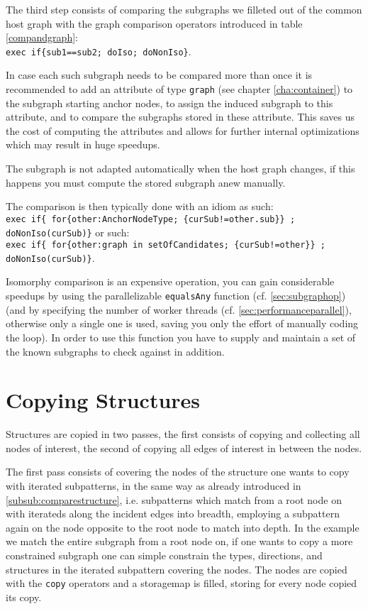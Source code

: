 The third step consists of comparing the subgraphs we filleted out of the common host graph with the graph comparison operators introduced in table \ref{compandgraph}:\\
\verb#exec if{sub1==sub2; doIso; doNonIso}#.

In case each such subgraph needs to be compared more than once it is recommended to add an attribute of type \texttt{graph} (see chapter \ref{cha:container}) to the subgraph starting anchor nodes, to assign the induced subgraph to this attribute, and to compare the subgraphs stored in these attribute.
This saves us the cost of computing the attributes and allows for further internal optimizations which 
may result in huge speedups.

\begin{warning}
The subgraph is not adapted automatically when the host graph changes, if this happens you must compute the stored subgraph anew manually.
\end{warning}

\noindent The comparison is then typically done with an idiom as such:\\
\verb#exec if{ for{other:AnchorNodeType; {curSub!=other.sub}} ; doNonIso(curSub)}# 
or such:\\
\verb#exec if{ for{other:graph in setOfCandidates; {curSub!=other}} ; doNonIso(curSub)}#.

Isomorphy comparison is an expensive operation, you can gain considerable speedups by using the parallelizable \texttt{equalsAny} function (cf. \ref{sec:subgraphop}) (and by specifying the number of worker threads (cf. \ref{sec:performanceparallel}), otherwise only a single one is used, saving you only the effort of manually coding the loop). 
In order to use this function you have to supply and maintain a set of the known subgraphs to check against in addition. 

\section{Copying Structures}\label{subsub:copystructure}
Structures are copied in two passes, the first consists of copying and collecting all nodes of interest, the second of copying all edges of interest in between the nodes.

The first pass consists of covering the nodes of the structure one wants to copy with iterated subpatterns,
in the same way as already introduced in \ref{subsub:comparestructure},
i.e. subpatterns which match from a root node on with iterateds along the incident edges into breadth,
employing a subpattern again on the node opposite to the root node to match into depth.
In the example we match the entire subgraph from a root node on, if one wants to copy a more constrained subgraph one can simple constrain the types, directions, and structures in the iterated subpattern covering the nodes.
The nodes are copied with the \texttt{copy} operators and a storagemap is filled, storing for every node copied its copy.

